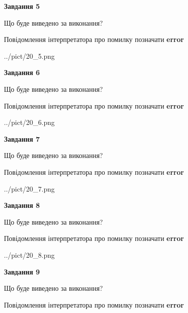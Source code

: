 \documentclass[11pt, ukrainian]{article}
\begin{document}
{\begin {large}
{\begin {center}\textbf{Завдання 5}\end {center}}\par
Що буде виведено за виконання? \par
Повідомлення інтерпретатора про помилку позначати \textbf{error}

\begin{center}
	{../pict/20_5.png}
\end{center}
\newpage

{\begin {center}\textbf{Завдання 6}\end {center}}\par
Що буде виведено за виконання? \par
Повідомлення інтерпретатора про помилку позначати \textbf{error}

\begin{center}
	{../pict/20_6.png}
\end{center}
\newpage

{\begin {center}\textbf{Завдання 7}\end {center}}\par
Що буде виведено за виконання? \par
Повідомлення інтерпретатора про помилку позначати \textbf{error}

\begin{center}
	{../pict/20_7.png}
\end{center}
\newpage

{\begin {center}\textbf{Завдання 8}\end {center}}\par
Що буде виведено за виконання? \par
Повідомлення інтерпретатора про помилку позначати \textbf{error}

\begin{center}
	{../pict/20_8.png}
\end{center}
\newpage

{\begin {center}\textbf{Завдання 9}\end {center}}\par
Що буде виведено за виконання? \par
Повідомлення інтерпретатора про помилку позначати \textbf{error}


\end{large}}
\end{document}
